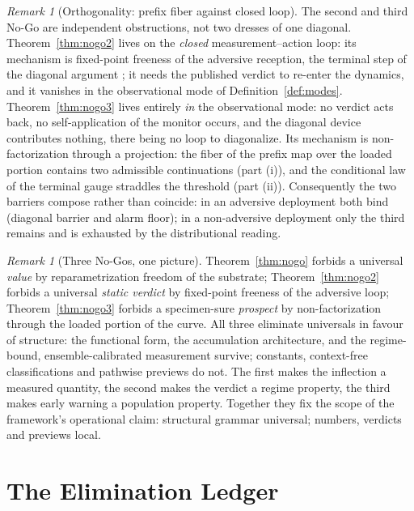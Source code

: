 \documentclass[11pt]{article}
\theoremstyle{plain}
\theoremstyle{definition}
\theoremstyle{remark}
\newtheorem{remark}[theorem]{Remark}
\begin{document}
\begin{remark}[Orthogonality: prefix fiber against closed loop]\label{rem:nogo3orth}
The second and third No-Go are independent obstructions, not two dresses of one diagonal. Theorem~\ref{thm:nogo2} lives on the \emph{closed} measurement--action loop: its mechanism is fixed-point freeness of the adversive reception, the terminal step of the diagonal argument \citep{lawvere1969,yanofsky2003}; it needs the published verdict to re-enter the dynamics, and it vanishes in the observational mode of Definition~\ref{def:modes}. Theorem~\ref{thm:nogo3} lives entirely \emph{in} the observational mode: no verdict acts back, no self-application of the monitor occurs, and the diagonal device contributes nothing, there being no loop to diagonalize. Its mechanism is non-factorization through a projection: the fiber of the prefix map over the loaded portion contains two admissible continuations (part (i)), and the conditional law of the terminal gauge straddles the threshold (part (ii)). Consequently the two barriers compose rather than coincide: in an adversive deployment both bind (diagonal barrier and alarm floor); in a non-adversive deployment only the third remains and is exhausted by the distributional reading.
\end{remark}

\begin{remark}[Three No-Gos, one picture]\label{rem:threenogos}
Theorem~\ref{thm:nogo} forbids a universal \emph{value} by reparametrization freedom of the substrate; Theorem~\ref{thm:nogo2} forbids a universal \emph{static verdict} by fixed-point freeness of the adversive loop; Theorem~\ref{thm:nogo3} forbids a specimen-sure \emph{prospect} by non-factorization through the loaded portion of the curve. All three eliminate universals in favour of structure: the functional form, the accumulation architecture, and the regime-bound, ensemble-calibrated measurement survive; constants, context-free classifications and pathwise previews do not. The first makes the inflection a measured quantity, the second makes the verdict a regime property, the third makes early warning a population property. Together they fix the scope of the framework's operational claim: structural grammar universal; numbers, verdicts and previews local.
\end{remark}

\section{The Elimination Ledger}\label{sec:ledger}
\end{document}
